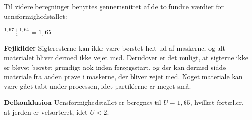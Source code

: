 Til videre beregninger benyttes gennemsnittet af de to fundne værdier for uensformighedstallet: 

\begin{center}
	$\frac{1,\!67+1,\!64}{2}=1,\!65$
\end{center}

\textbf{Fejlkilder}
\newline
Sigteresterne kan ikke være børstet helt ud af maskerne, og alt materialet bliver dermed ikke vejet med. Derudover er det muligt, at sigterne ikke er blevet børstet grundigt nok inden forsøgsstart, og der kan dermed sidde materiale fra anden prøve i maskerne, der bliver vejet med.
\newline
Noget materiale kan være gået tabt under processen, idet partiklerne er meget små. 
\newline
\newline

\textbf{Delkonklusion}
\newline
Uensformighedstallet er beregnet til $U=1,\!65$, hvilket fortæller, at jorden er velsorteret, idet $U<2$.  